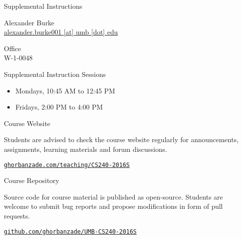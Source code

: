 \documentclass[compress]{beamer}
\begin{document}
\begin{slide}
	\begin{block}{Supplemental Instructions}

	Alexander Burke\\
	\href{mailto:alexander.burke001@umb.edu}{alexander.burke001 [at] umb [dot] edu}

	\par
	\vspace{0.5em}
	{\large Office}\\
	W-1-0048

	\par
	\vspace{0.5em}
	{\large Supplemental Instruction Sessions}
	\begin{itemize}
	\item[] Mondays, 10:45 AM to 12:45 PM
	\item[] Fridays, 2:00 PM to 4:00 PM
	\end{itemize}

	\end{block}
\end{slide}

\begin{slide}
	\begin{block}{Course Website}

	Students are advised to check the course website regularly for announcements, assignments, learning materials and forum discussions.

	\begin{center}
	\href{http://ghorbanzade.com/teaching/cs240-2016s}{\texttt{ghorbanzade.com/teaching/CS240-2016S}}
	\end{center}

	\end{block}
\end{slide}

\begin{slide}
	\begin{block}{Course Repository}

	Source code for course material is published as open-source.
	Students are welcome to submit bug reports and propose modifications in form of pull requests.

	\begin{center}
	\href{https://github.com/ghorbanzade/umb-cs240-2016s}{\texttt{github.com/ghorbanzade/UMB-CS240-2016S}}
	\end{center}

	\end{block}
\end{slide}
\end{document}
